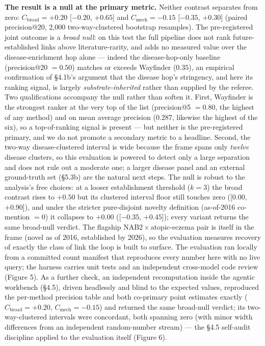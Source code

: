 \textbf{The result is a null at the primary metric.} Neither contrast separates from
zero: $C_{\mathrm{broad}} = +0.20$ [$-0.20$, $+0.65$] and $C_{\mathrm{mech}} = -0.15$ [$-0.35$, $+0.30$]
(paired precision@20, 2{,}000 two-way-clustered bootstrap resamples). The pre-registered joint outcome is a
\emph{broad null}: on this test the full pipeline does not rank future-established links above literature-rarity,
and adds no measured value over the disease-enrichment hop alone --- indeed the disease-hop-only baseline
(precision@20 $= 0.50$) matches or exceeds Wayfinder ($0.35$), an empirical confirmation of \S{}4.1b's argument
that the disease hop's stringency, and here its ranking signal, is largely \emph{substrate-inherited} rather
than supplied by the referee. Two qualifications accompany the null rather than soften it. First,
Wayfinder is the strongest ranker at the very top of the list (precision@5 $= 0.80$, the highest of any method)
and on mean average precision ($0.287$, likewise the highest of the six), so a top-of-ranking signal is present
--- but neither is the pre-registered primary, and we do not promote a secondary metric to a headline. Second,
the two-way disease-clustered interval is wide because the frame spans only \emph{twelve} disease clusters, so
this evaluation is powered to detect only a large separation and does not rule out a moderate one; a larger
disease panel and an external ground-truth set (\S{}5.3b) are the natural next steps. The null is robust to the
analysis's free choices: at a looser establishment threshold ($k = 3$) the broad contrast rises to $+0.50$ but
its clustered interval floor still touches zero ([$0.00$, $+0.90$]), and under the stricter pure-disjoint
novelty definition (as-of-2016 co-mention $= 0$) it collapses to $+0.00$ ([$-0.35$, $+0.45$]); every variant
returns the same broad-null verdict. The flagship
NAB2\,$\times$\,atopic-eczema pair is itself in the frame (novel as of 2016, established by 2026), so the
evaluation measures recovery of exactly the class of link the loop is built to surface. The evaluation ran
locally from a committed count manifest that reproduces every number here with no live query; the harness
carries unit tests and an independent cross-model code review (Figure 5). As a further check, an independent
recomputation inside the agentic workbench (\S{}4.5), driven headlessly and blind to the expected values,
reproduced the per-method precision table and both co-primary point estimates exactly
($C_{\mathrm{broad}} = +0.20$, $C_{\mathrm{mech}} = -0.15$) and returned the same broad-null verdict; its
two-way-clustered intervals were concordant, both spanning zero (with minor width differences from an
independent random-number stream) --- the \S{}4.5 self-audit discipline applied to the evaluation itself
(Figure 6).

